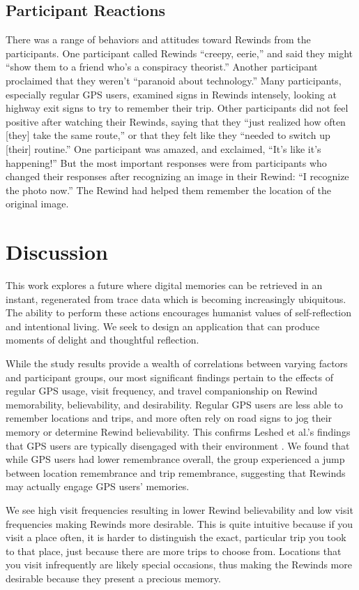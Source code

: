 \documentclass{sigchi}
\begin{document}
\subsection{Participant Reactions}
There was a range of behaviors and attitudes toward Rewinds from the participants. One participant called Rewinds ``creepy, eerie,'' and said they might ``show them to a friend who's a conspiracy theorist.'' Another participant proclaimed that they weren't ``paranoid about technology.'' Many participants, especially regular GPS users, examined signs in Rewinds intensely, looking at highway exit signs to try to remember their trip. Other participants did not feel positive after watching their Rewinds, saying that they ``just realized how often [they] take the same route,'' or that they felt like they ``needed to switch up [their] routine.'' One participant was amazed, and exclaimed, ``It's like it's happening!'' But the most important responses were from participants who changed their responses after recognizing an image in their Rewind: ``I recognize the photo now.'' The Rewind had helped them remember the location of the original image.

\section{Discussion}
This work explores a future where digital memories can be retrieved in an instant, regenerated from trace data which is becoming increasingly ubiquitous. The ability to perform these actions encourages humanist values of self-reflection and intentional living. We seek to design an application that can produce moments of delight and thoughtful reflection.

While the study results provide a wealth of correlations between varying factors and participant groups, our most significant findings pertain to the effects of regular GPS usage, visit frequency, and travel companionship on Rewind memorability, believability, and desirability. Regular GPS users are less able to remember locations and trips, and more often rely on road signs to jog their memory or determine Rewind believability. This confirms Leshed et al.'s findings that GPS users are typically disengaged with their environment \cite{leshed2008car}. We found that while GPS users had lower remembrance overall, the group experienced a jump between location remembrance and trip remembrance, suggesting that Rewinds may actually engage GPS users' memories. 

We see high visit frequencies resulting in lower Rewind believability and low visit frequencies making Rewinds more desirable. This is quite intuitive because if you visit a place often, it is harder to distinguish the exact, particular trip you took to that place, just because there are more trips to choose from. Locations that you visit infrequently are likely special occasions, thus making the Rewinds more desirable because they present a precious memory.
\end{document}
